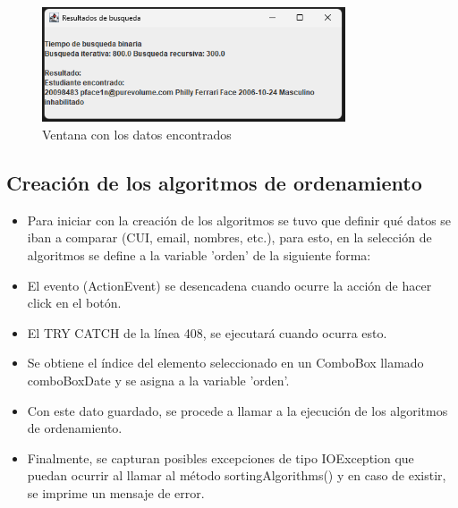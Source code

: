 \documentclass{article}
\begin{document}
     \begin{figure}[H]
        \centering
	\includegraphics[width=0.8\textwidth,keepaspectratio]{img/Result_Search.png}
        \caption{Ventana con los datos encontrados}
    \end{figure}
 

    \subsection{Creación de los algoritmos de ordenamiento}
    
        \begin{itemize}	
            \item Para iniciar con la creación de los algoritmos se tuvo que definir qué datos se iban a comparar (CUI, email, nombres, etc.), para esto, en la selección de algoritmos se define a la variable 'orden' de la siguiente forma:
        \end{itemize}
        
        

        \begin{itemize}
            \item El evento (ActionEvent) se desencadena cuando ocurre la acción de hacer click en el botón.
            \item El TRY CATCH de la línea 408, se ejecutará cuando ocurra esto.
            \item Se obtiene el índice del elemento seleccionado en un ComboBox llamado comboBoxDate y se asigna a la variable 'orden'.
            \item Con este dato guardado, se procede a llamar a la ejecución de los algoritmos de ordenamiento.
            \item Finalmente, se capturan posibles excepciones de tipo IOException que puedan ocurrir al llamar al método sortingAlgorithms() y en caso de existir, se imprime un mensaje de error.
        \end{itemize}
\end{document}

